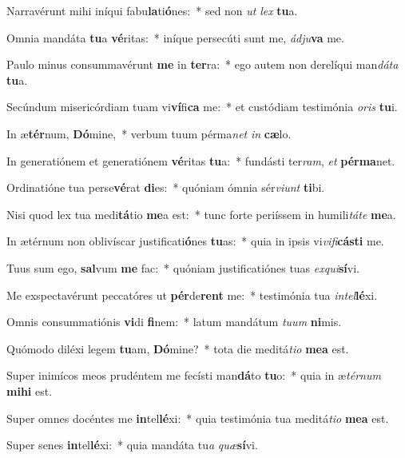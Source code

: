 \item Narravérunt mihi iníqui fabu\textbf{la}ti\textbf{ó}nes:~* sed non \textit{ut} \textit{lex} \textbf{tu}a.
\item Omnia mandáta \textbf{tu}a \textbf{vé}ritas:~* iníque persecúti sunt me, \textit{ád}\textit{ju}\textbf{va} me.
\item Paulo minus consummavérunt \textbf{me} in \textbf{ter}ra:~* ego autem non derelíqui man\textit{dá}\textit{ta} \textbf{tu}a.
\item Secúndum misericórdiam tuam vi\textbf{ví}fi\textbf{ca} me:~* et custódiam testimónia \textit{o}\textit{ris} \textbf{tu}i.
\item In æ\textbf{tér}num, \textbf{Dó}mine,~* verbum tuum pérma\textit{net} \textit{in} \textbf{cæ}lo.
\item In generatiónem et generatiónem \textbf{vé}ritas \textbf{tu}a:~* fundásti ter\textit{ram}, \textit{et} \textbf{pér}\textbf{ma}net.
\item Ordinatióne tua perse\textbf{vé}rat \textbf{di}es:~* quóniam ómnia sér\textit{vi}\textit{unt} \textbf{ti}bi.
\item Nisi quod lex tua medi\textbf{tá}tio \textbf{me}a est:~* tunc forte periíssem in humili\textit{tá}\textit{te} \textbf{me}a.
\item In ætérnum non oblivíscar justificati\textbf{ó}nes \textbf{tu}as:~* quia in ipsis vi\textit{vi}\textit{fi}\textbf{cás}\textbf{ti} me.
\item Tuus sum ego, \textbf{sal}vum \textbf{me} fac:~* quóniam justificatiónes tuas \textit{ex}\textit{qui}\textbf{sí}vi.
\item Me exspectavérunt peccatóres ut \textbf{pér}de\textbf{rent} me:~* testimónia tua \textit{in}\textit{tel}\textbf{lé}xi.
\item Omnis consummatiónis \textbf{vi}di \textbf{fi}nem:~* latum mandátum \textit{tu}\textit{um} \textbf{ni}mis.
\item Quómodo diléxi legem \textbf{tu}am, \textbf{Dó}mine?~* tota die meditá\textit{ti}\textit{o} \textbf{me}\textbf{a} est.
\item Super inimícos meos prudéntem me fecísti man\textbf{dá}to \textbf{tu}o:~* quia in æ\textit{tér}\textit{num} \textbf{mi}\textbf{hi} est.
\item Super omnes docéntes me \textbf{in}tel\textbf{lé}xi:~* quia testimónia tua meditá\textit{ti}\textit{o} \textbf{me}\textbf{a} est.
\item Super senes \textbf{in}tel\textbf{lé}xi:~* quia mandáta tu\textit{a} \textit{quæ}\textbf{sí}vi.
